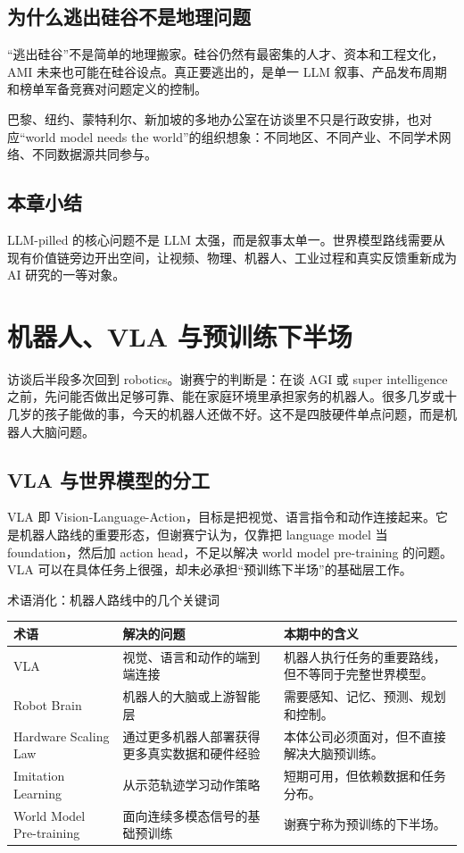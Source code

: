 \documentclass[a4paper]{article}
\begin{document}
\subsection{为什么逃出硅谷不是地理问题}

“逃出硅谷”不是简单的地理搬家。硅谷仍然有最密集的人才、资本和工程文化，AMI 未来也可能在硅谷设点。真正要逃出的，是单一 LLM 叙事、产品发布周期和榜单军备竞赛对问题定义的控制。

巴黎、纽约、蒙特利尔、新加坡的多地办公室在访谈里不只是行政安排，也对应“world model needs the world”的组织想象：不同地区、不同产业、不同学术网络、不同数据源共同参与。

\subsection{本章小结}

LLM-pilled 的核心问题不是 LLM 太强，而是叙事太单一。世界模型路线需要从现有价值链旁边开出空间，让视频、物理、机器人、工业过程和真实反馈重新成为 AI 研究的一等对象。

\section{机器人、VLA 与预训练下半场}

访谈后半段多次回到 robotics。谢赛宁的判断是：在谈 AGI 或 super intelligence 之前，先问能否做出足够可靠、能在家庭环境里承担家务的机器人。很多几岁或十几岁的孩子能做的事，今天的机器人还做不好。这不是四肢硬件单点问题，而是机器人大脑问题。

\subsection{VLA 与世界模型的分工}

VLA 即 Vision-Language-Action，目标是把视觉、语言指令和动作连接起来。它是机器人路线的重要形态，但谢赛宁认为，仅靠把 language model 当 foundation，然后加 action head，不足以解决 world model pre-training 的问题。VLA 可以在具体任务上很强，却未必承担“预训练下半场”的基础层工作。

\begin{knowledgebox}{术语消化：机器人路线中的几个关键词}
\begin{tabularx}{\textwidth}{p{}p{}X}
\toprule
术语 & 解决的问题 & 本期中的含义 \\
\midrule
VLA & 视觉、语言和动作的端到端连接 & 机器人执行任务的重要路线，但不等同于完整世界模型。 \\
Robot Brain & 机器人的大脑或上游智能层 & 需要感知、记忆、预测、规划和控制。 \\
Hardware Scaling Law & 通过更多机器人部署获得更多真实数据和硬件经验 & 本体公司必须面对，但不直接解决大脑预训练。 \\
Imitation Learning & 从示范轨迹学习动作策略 & 短期可用，但依赖数据和任务分布。 \\
World Model Pre-training & 面向连续多模态信号的基础预训练 & 谢赛宁称为预训练的下半场。 \\
\bottomrule
\end{tabularx}
\end{knowledgebox}
\end{document}
